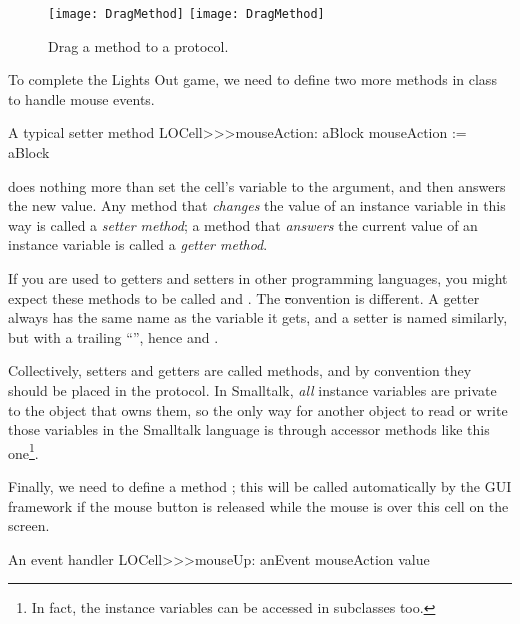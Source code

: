 \documentclass[a4paper,10pt,twoside]{book}
\begin{document}
\begin{figure}[htbp]
   \centering
   \ifluluelse
		{\texttt{[image: DragMethod]} }
		{\texttt{[image: DragMethod]} }
   \caption{Drag a method to a protocol.}
\end{figure}

To complete the Lights Out game, we need to define two more methods in class  to handle mouse events.
\begin{method}[mouseAction:]{A typical setter method}
LOCell>>>mouseAction: aBlock
   mouseAction := aBlock
\end{method}

 does nothing more than set the cell's  variable to the argument, and then answers the new value.
Any method that \emph{changes} the value of an instance variable in this way is called a \emph{setter method}; a method that \emph{answers} the current value of an instance variable is called a \emph{getter method}.

If you are used to getters and setters in other programming languages, you might expect these methods to be called  and .
The \st convention is different.
A getter always has the same name as the variable it gets, and a setter is named similarly, but with a trailing ``\ct{:}'', hence  and .

Collectively, setters and getters are called   methods, and by convention they should be placed in the  protocol.
In Smalltalk, \emph{all} instance variables are private to the object that owns them, so the only way for another object to read or write those variables in the Smalltalk language is through accessor methods like this one\footnote{In fact, the instance variables can be accessed in subclasses too.}.


Finally, we need to define a method ; this will be called automatically by the GUI framework if the mouse button is released while the mouse is over this cell on the screen.

\begin{method}[sbecellmouseup]{An event handler}
LOCell>>>mouseUp: anEvent
   mouseAction value
\end{method}
\end{document}
